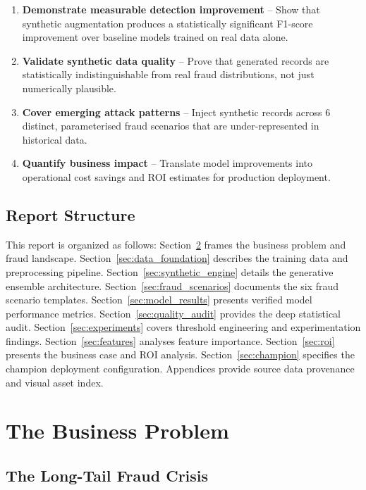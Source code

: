 \documentclass[12pt,a4paper,oneside]{book}
\begin{document}
\begin{enumerate}
    \item \textbf{Demonstrate measurable detection improvement} -- Show that synthetic augmentation produces a statistically significant F1-score improvement over baseline models trained on real data alone.
    \item \textbf{Validate synthetic data quality} -- Prove that generated records are statistically indistinguishable from real fraud distributions, not just numerically plausible.
    \item \textbf{Cover emerging attack patterns} -- Inject synthetic records across 6 distinct, parameterised fraud scenarios that are under-represented in historical data.
    \item \textbf{Quantify business impact} -- Translate model improvements into operational cost savings and ROI estimates for production deployment.
\end{enumerate}

\section{Report Structure}

This report is organized as follows: Section~\ref{sec:business_problem} frames the business problem and fraud landscape. Section~\ref{sec:data_foundation} describes the training data and preprocessing pipeline. Section~\ref{sec:synthetic_engine} details the generative ensemble architecture. Section~\ref{sec:fraud_scenarios} documents the six fraud scenario templates. Section~\ref{sec:model_results} presents verified model performance metrics. Section~\ref{sec:quality_audit} provides the deep statistical audit. Section~\ref{sec:experiments} covers threshold engineering and experimentation findings. Section~\ref{sec:features} analyses feature importance. Section~\ref{sec:roi} presents the business case and ROI analysis. Section~\ref{sec:champion} specifies the champion deployment configuration. Appendices provide source data provenance and visual asset index.

\clearpage

\chapter{The Business Problem}
\label{sec:business_problem}
\thispagestyle{fancy}

\section{The Long-Tail Fraud Crisis}
\end{document}
